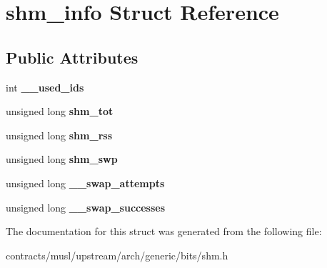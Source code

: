 \hypertarget{structshm__info}{}\section{shm\+\_\+info Struct Reference}
\label{structshm__info}
\subsection*{Public Attributes}
\begin{DoxyCompactItemize}
\item 
\mbox{\label{structshm__info_aa2de99231240b0e9e36cb1720bba0ef5}} 
int {\bfseries \+\_\+\+\_\+used\+\_\+ids}
\item 
\mbox{\label{structshm__info_a68b58013a245638488a89c6026a757a5}} 
unsigned long {\bfseries shm\+\_\+tot}
\item 
\mbox{\label{structshm__info_a677b785fd7c65a72a2a3e5c361ced94f}} 
unsigned long {\bfseries shm\+\_\+rss}
\item 
\mbox{\label{structshm__info_a55655441c2480741960372b4ae5aa76b}} 
unsigned long {\bfseries shm\+\_\+swp}
\item 
\mbox{\label{structshm__info_a994182b446373fe20ba4392fac1608df}} 
unsigned long {\bfseries \+\_\+\+\_\+swap\+\_\+attempts}
\item 
\mbox{\label{structshm__info_a612f7346d1f84cd756fa9ee4ba68cc14}} 
unsigned long {\bfseries \+\_\+\+\_\+swap\+\_\+successes}
\end{DoxyCompactItemize}


The documentation for this struct was generated from the following file\+:\begin{DoxyCompactItemize}
\item 
contracts/musl/upstream/arch/generic/bits/shm.\+h\end{DoxyCompactItemize}
